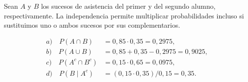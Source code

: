 Sean $A$ y $B$ los sucesos de asistencia del primer y del segundo alumno, respectivamente. La independencia permite multiplicar probabilidades incluso si sustituimos uno o ambos sucesos por sus complementarios.

\[
\begin{aligned}
a)\quad P(A\cap B)&=0{,}85\cdot0{,}35=\boxed{0{,}2975},\\
b)\quad P(A\cup B)&=0{,}85+0{,}35-0{,}2975=\boxed{0{,}9025},\\
c)\quad P(A^c\cap B^c)&=0{,}15\cdot0{,}65=\boxed{0{,}0975},\\
d)\quad P(B\mid A^c)&=(0{,}15\cdot0{,}35)/0{,}15=\boxed{0{,}35}.
\end{aligned}
\]
